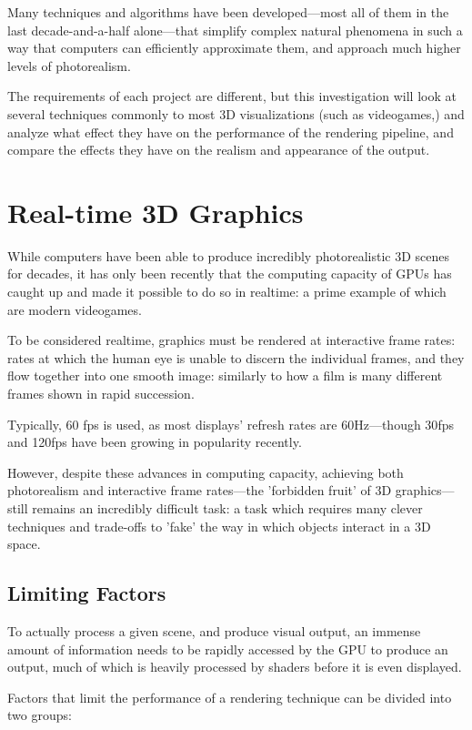 \documentclass[11pt, oneside]{report}
\begin{document}
Many techniques and algorithms have been developed—most all of them in the last decade-and-a-half alone—that simplify complex natural phenomena in such a way that computers can efficiently approximate them, and approach much higher levels of photorealism.

The requirements of each project are different, but this investigation will look at several techniques commonly to most 3D visualizations (such as videogames,) and analyze what effect they have on the performance of the rendering pipeline, and compare the effects they have on the realism and appearance of the output.

\section{Real-time 3D Graphics}
While computers have been able to produce incredibly photorealistic 3D scenes for decades, it has only been recently that the computing capacity of \glspl{GPU} has caught up and made it possible to do so in realtime: a prime example of which are modern videogames.

To be considered realtime, graphics must be rendered at interactive \glspl{frame rate}: rates at which the human eye is unable to discern the individual frames, and they flow together into one smooth image: similarly to how a film is many different frames shown in rapid succession.

Typically, 60 \gls{fps} is used, as most displays' \glspl{refresh rate} are 60Hz---though 30\gls{fps} and 120\gls{fps} have been growing in popularity recently.

However, despite these advances in computing capacity, achieving both photorealism and interactive \glspl{frame rate}---the 'forbidden fruit' of 3D graphics---still remains an incredibly difficult task: a task which requires many clever techniques and trade-offs to 'fake' the way in which objects interact in a 3D space.

\subsection{Limiting Factors}
To actually process a given scene, and produce visual output, an immense amount of information needs to be rapidly accessed by the \gls{GPU} to produce an output, much of which is heavily processed by \glspl{shader} before it is even displayed.

Factors that limit the performance of a rendering technique can be divided into two groups:
\end{document}
